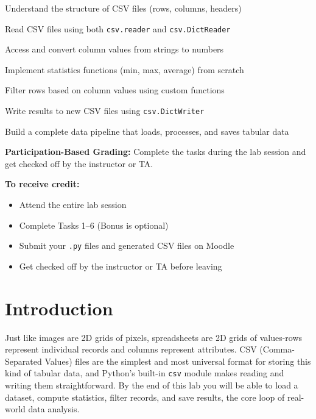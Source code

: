 \documentclass{cslab}
\begin{document}
\maketitle

\begin{objectives}
    \item Understand the structure of CSV files (rows, columns, headers)
    \item Read CSV files using both \texttt{csv.reader} and \texttt{csv.DictReader}
    \item Access and convert column values from strings to numbers
    \item Implement statistics functions (min, max, average) from scratch
    \item Filter rows based on column values using custom functions
    \item Write results to new CSV files using \texttt{csv.DictWriter}
    \item Build a complete data pipeline that loads, processes, and saves tabular data
\end{objectives}

\begin{grading}
\textbf{Participation-Based Grading:} Complete the tasks during the lab session and get checked off by the instructor or TA.

\textbf{To receive credit:}
\begin{itemize}
    \item Attend the entire lab session
    \item Complete Tasks 1--6 (Bonus is optional)
    \item Submit your \texttt{.py} files and generated CSV files on Moodle
    \item Get checked off by the instructor or TA before leaving
\end{itemize}
\end{grading}

\section{Introduction}

Just like images are 2D grids of pixels, spreadsheets are 2D grids of values-rows represent individual records and columns represent attributes. CSV (Comma-Separated Values) files are the simplest and most universal format for storing this kind of tabular data, and Python's built-in \texttt{csv} module makes reading and writing them straightforward. By the end of this lab you will be able to load a dataset, compute statistics, filter records, and save results, the core loop of real-world data analysis.
\end{document}
